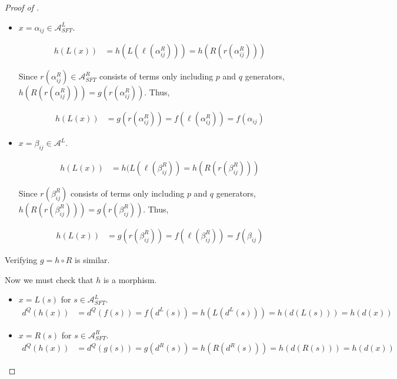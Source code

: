 \documentclass[a4paper,final, reqno]{amsart}
\theoremstyle{plain}
\theoremstyle{definition}
\newcommand{\A}{\mathcal{A}}
\begin{document}
\begin{proof}[Proof of ]
\begin{itemize}
				Then $h(L(x)) = f(x)$ by definition.
				
				\item $x=\alpha_{ij} \in \A^L_{SFT}$.
				
				\begin{align*}
					h(L(x)) &= h(L(\ell(\alpha_{ij}^R))) = h(R(r(\alpha_{ij}^R)))
				\end{align*}
				
				Since $r(\alpha_{ij}^R) \in \A^R_{SFT}$ consists of terms only including $p$ and $q$ generators, $h(R(r(\alpha_{ij}^R))) = g(r(\alpha_{ij}^R))$. Thus,
				
				\begin{align*}
					h(L(x)) &= g(r(\alpha_{ij}^R)) = f(\ell(\alpha_{ij}^R)) = f(\alpha_{ij})
				\end{align*}
				
				\item $x=\beta_{ij} \in \A^L$.
				
				\begin{align*}
					h(L(x)) &= h(L(\ell(\beta_{ij}^R)) = h(R(r(\beta_{ij}^R)))
				\end{align*}
				
				Since $r(\beta_{ij}^R)$ consists of terms only including $p$ and $q$ generators, $h(R(r(\beta_{ij}^R))) = g(r(\beta_{ij}^R))$. Thus,
				
				\begin{align*}
					h(L(x)) &= g(r(\beta_{ij}^R)) = f(\ell(\beta_{ij}^R)) = f(\beta_{ij})
				\end{align*}
				
				
				
			\end{itemize}
			
			Verifying $g=h\circ R$ is similar.
			
			
			Now we must check that $h$ is a morphism.
			
			\begin{itemize}
				\item $x = L(s)$ for $s\in \A^L_{SFT}$.
				\begin{align*}
					d^Q(h(x)) &= d^Q(f(s)) = f(d^L(s)) = h(L(d^L(s))) = h(d(L(s))) = h(d(x)) 
				\end{align*}
				
				\item $x=R(s)$ for $s\in \A^R_{SFT}$.
				\begin{align*}
					d^Q(h(x)) &= d^Q(g(s)) = g(d^R(s)) = h(R(d^R(s))) = h(d(R(s))) = h(d(x)) 
				\end{align*}
				
			\end{itemize}
			
			
		\end{proof}
		
\end{document}
